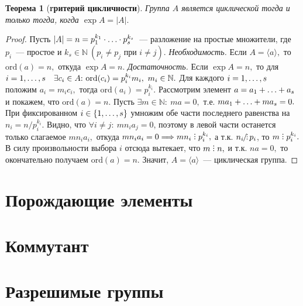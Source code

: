\documentclass[a4paper, 14pt]{extarticle}
\newcommand{\naturals}{\mathbb{N}}
\newcommand{\ord}{\mathrm{ord}}
\newcommand{\suchthat}{{:}{ } \ }
\DeclareRobustCommand{\divby}{%
	\mathrel{\text{\vbox{\baselineskip.65ex\lineskiplimit0pt\hbox{.}\hbox{.}\hbox{.}}}}%
}
\DeclareRobustCommand{\ndivby}{%
	\mathrel{\text{%
			\vbox{\baselineskip.65ex\lineskiplimit0pt\hbox{.}\hbox{.}\hbox{.}}%
			\kern-1.5ex\hbox{/}%
	}}%
}
\theoremstyle{definition}
\theoremstyle{plain}
\newtheorem*{theorem*}{Теорема}
\numberwithin{theorem}{section}
\numberwithin{definition}{section}
\numberwithin{statement}{section}
\numberwithin{lemma}{section}
\numberwithin{consequence}{section}
\begin{document}
        \newpage
	\begin{theorem*}[\textbf{rритерий цикличности}]
		Группа $A$ является циклической тогда и только тогда, когда ${\exp A = |A|.}$
	\end{theorem*}
	\begin{proof}
		Пусть ${|A| = n = p^{k_1}_1 \cdot \mathellipsis \cdot p^{k_s}_s}$~--- разложение на простые множители, где $p_i$~--- простое и ${k_s \in \naturals \ (p_i \neq p_j \text{ при } i \neq j).}$ \newline
		{\textit{Необходимость.}} Если ${A = \langle a \rangle,}$ то ${\ord (a) = n,}$ откуда ${\exp A = n.}$ \newline
		{\textit{Достаточность.}} Если ${\exp A = n,}$ то для ${i = 1, \mathellipsis, s \quad \exists c_i \in A \suchthat \ord(c_i) = p^{k_i}_i m_i, \ m_i \in \naturals.}$ Для каждого ${i = 1, \mathellipsis, s}$ положим ${a_i = m_i c_i,}$ тогда ${\ord(a_i) = p^{k_i}_i.}$ Рассмотрим элемент ${a = a_1 + \mathellipsis + a_s}$ и покажем, что ${\ord(a) = n.}$ Пусть ${\exists m \in \naturals \suchthat ma = 0,}$ т.е. ${ma_1 + \mathellipsis + ma_s = 0.}$ При фиксированном ${i \in \{1, \mathellipsis, s\}}$ умножим обе части последнего равенства на ${n_i = n/p^{k_i}_i.}$ Видно, что ${\forall i \neq j{:} \ mn_ia_j = 0}$, поэтому в левой части останется только слагаемое ${mn_ia_i,}$ откуда ${mn_ia_i = 0 \Longrightarrow mn_i \divby p^{k_i}_i,}$ а т.к. 
		${n_i \ndivby p_i}$, то ${m \divby p^{k_i}_i.}$  В силу произвольности выбора $i$ отсюда вытекает, что ${m \divby n,}$ и т.к. ${na = 0,}$ то окончательно получаем ${\ord(a) = n.}$ Значит, ${A = \langle a \rangle}$~--- циклическая группа.
	\end{proof}
    
        \newpage
        \section{Порождающие элементы}
        \setcounter{definition}{0}

        \newpage
        \section{Коммутант}
        \setcounter{definition}{0}
        
        \newpage
        \section{Разрешимые группы}
        \setcounter{definition}{0}
\end{document}
